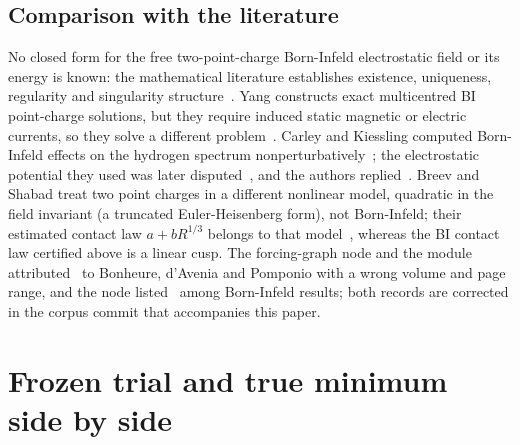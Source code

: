 \documentclass[aps,prd,onecolumn,amsmath,amssymb,longbibliography,floatfix,nofootinbib]{revtex4-2}
\begin{document}
\subsection{Comparison with the literature}
No closed form for the free two-point-charge Born-Infeld electrostatic field or its energy is known: the mathematical literature establishes existence, uniqueness, regularity and singularity structure~\cite{BdAP2016,BCF2019}. Yang constructs exact multicentred BI point-charge solutions, but they require induced static magnetic or electric currents, so they solve a different problem~\cite{Yang2023}. Carley and Kiessling computed Born-Infeld effects on the hydrogen spectrum nonperturbatively~\cite{CarleyKiessling2006}; the electrostatic potential they used was later disputed~\cite{Smolyakov2022}, and the authors replied~\cite{CarleyKiessling2024}. Breev and Shabad treat two point charges in a different nonlinear model, quadratic in the field invariant (a truncated Euler-Heisenberg form), not Born-Infeld; their estimated contact law $a+bR^{1/3}$ belongs to that model~\cite{BreevShabad2018}, whereas the BI contact law certified above is a linear cusp. The forcing-graph node  and the module  attributed~\cite{BCF2019} to Bonheure, d'Avenia and Pomponio with a wrong volume and page range, and the node listed~\cite{BreevShabad2018} among Born-Infeld results; both records are corrected in the corpus commit that accompanies this paper.

\section{Frozen trial and true minimum side by side}
\end{document}
